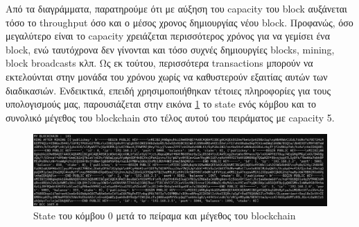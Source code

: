 \documentclass[12pt, a4paper]{article}
\begin{document}
\noindent
Από τα διαγράμματα, παρατηρούμε ότι με αύξηση του capacity του block αυξάνεται τόσο το throughput όσο και ο μέσος χρονος δημιουργίας νέου block. Προφανώς, όσο μεγαλύτερο είναι το capacity χρειάζεται περισσότερος χρόνος για να γεμίσει ένα block, ενώ ταυτόχρονα δεν γίνονται και τόσο συχνές δημιουργίες blocks, mining, block broadcasts κλπ. Ως εκ τούτου, περισσότερα transactions μπορούν να εκτελούνται στην μονάδα του χρόνου χωρίς να καθυστερούν εξαιτίας αυτών των διαδικασιών. 
Ενδεικτικά, επειδή χρησιμοποιήθηκαν τέτοιες πληροφορίες για τους υπολογισμούς μας, παρουσιάζεται στην εικόνα \ref{fig:state} το state ενός κόμβου και το συνολικό μέγεθος του blockchain στο τέλος αυτού του πειράματος με capacity 5.
\begin{figure}[h!]
	\centering
	\includegraphics[width=6.5in]{ring.png}
	\caption{State του κόμβου 0 μετά το πείραμα και μέγεθος του blockchain}
	\label{fig:state}
\end{figure}
\end{document}

